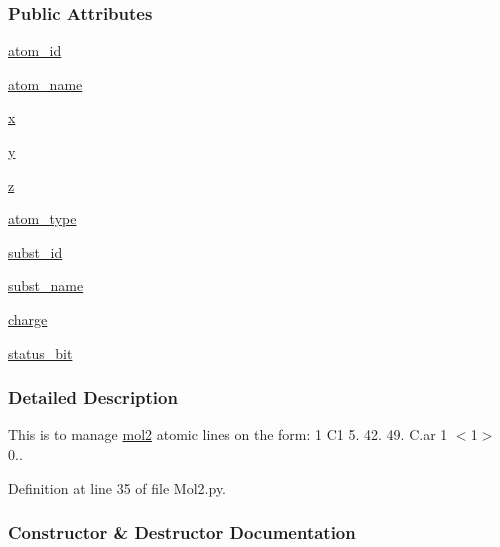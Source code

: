 \subsubsection*{Public Attributes}
\begin{DoxyCompactItemize}
\item 
\hyperlink{classsrc_1_1Mol2_1_1mol2__atom_ae1c8c0e30fbdc4448c58d4e920e2780e}{atom\+\_\+id}
\item 
\hyperlink{classsrc_1_1Mol2_1_1mol2__atom_a9917351f99ebd55b507fa4d13678ce3f}{atom\+\_\+name}
\item 
\hyperlink{classsrc_1_1Mol2_1_1mol2__atom_a47de8acee587e81e83a34d13cec168e8}{x}
\item 
\hyperlink{classsrc_1_1Mol2_1_1mol2__atom_a72e7b8443dc04e8f96dafd74ebb27f1c}{y}
\item 
\hyperlink{classsrc_1_1Mol2_1_1mol2__atom_ad7bd1ddebc525163f12de1e11b51bf02}{z}
\item 
\hyperlink{classsrc_1_1Mol2_1_1mol2__atom_ab50a6f7cf343864a3c40e912e0a3c5c6}{atom\+\_\+type}
\item 
\hyperlink{classsrc_1_1Mol2_1_1mol2__atom_a122963f0b3e9118adce5cec8ee511603}{subst\+\_\+id}
\item 
\hyperlink{classsrc_1_1Mol2_1_1mol2__atom_a7c92307326eb6c724031a9928ac050e3}{subst\+\_\+name}
\item 
\hyperlink{classsrc_1_1Mol2_1_1mol2__atom_ad2ae2ab0e831e178838b5fcb900c7ad8}{charge}
\item 
\hyperlink{classsrc_1_1Mol2_1_1mol2__atom_a471ab7ca3b2c033da344fef68a570e35}{status\+\_\+bit}
\end{DoxyCompactItemize}


\subsubsection{Detailed Description}
This is to manage \hyperlink{classsrc_1_1Mol2_1_1mol2}{mol2} atomic lines on the form\+: 1 C1 5. 42. 49. C.\+ar 1 $<$1$>$ 0.. 

Definition at line 35 of file Mol2.\+py.



\subsubsection{Constructor \& Destructor Documentation}
\mbox{\label{classsrc_1_1Mol2_1_1mol2__atom_ad0cd7d2c4aa948444e6ebb8090508689}} 
